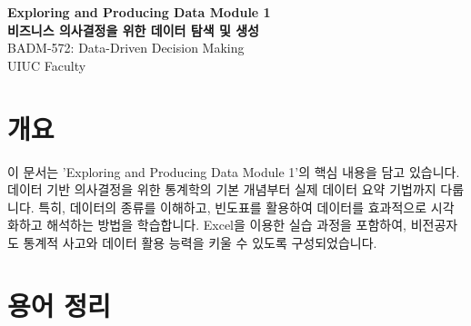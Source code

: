 \documentclass[11pt,a4paper]{article}
\begin{document}
\begin{center}
  \Huge\textbf{Exploring and Producing Data Module 1} \\
  \Large\textbf{비즈니스 의사결정을 위한 데이터 탐색 및 생성} \\
  \vspace{1cm}
  \large BADM-572: Data-Driven Decision Making \\
  \large UIUC Faculty
\end{center}

\newpage
\tableofcontents
\newpage

\section*{개요}
이 문서는 'Exploring and Producing Data Module 1'의 핵심 내용을 담고 있습니다.
데이터 기반 의사결정을 위한 통계학의 기본 개념부터 실제 데이터 요약 기법까지 다룹니다.
특히, 데이터의 종류를 이해하고, 빈도표를 활용하여 데이터를 효과적으로 시각화하고 해석하는 방법을 학습합니다.
Excel을 이용한 실습 과정을 포함하여, 비전공자도 통계적 사고와 데이터 활용 능력을 키울 수 있도록 구성되었습니다.

\newpage
\section*{용어 정리}
\end{document}
